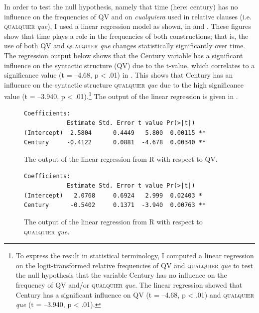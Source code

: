 In order to test the null hypothesis, namely that time (here: century) has no influence on the frequencies of QV and on \textit{cualquiera} used in relative clauses (i.e. \textsc{qualquier} \textit{que}), I used a linear regression model as shown, in  and . These figures show that time plays a role in the frequencies of both constructions; that is, the use of both QV and \textsc{qualquier} \textit{que} changes statistically significantly over time. The regression output below shows that the Century variable has a significant influence on the syntactic structure (QV) due to the t-value, which correlates to a significance value (t = –4.68, p < .01) in . This shows that Century has an influence on the syntactic structure \textsc{qualquier} \textit{que} due to the high significance value (t = –3.940, p < .01).\footnote{{To express the result in statistical terminology, I computed a linear regression on the logit-transformed relative frequencies of QV and} \textsc{qualquier}{ \textit{que}} {to test the null hypothesis that the variable Century has no influence on the frequency of QV and/or} \textsc{qualquier} {\textit{que}}{. The linear regression showed that Century has a significant influence on QV (t = –4.68, p < .01) and} \textsc{qualquier} {\textit{que}} {(t = –3.940, p < .01).}} The output of the linear regression is given in .


\begin{figure}
\begin{lstlisting}
Coefficients:
            Estimate Std. Error t value Pr(>|t|)
(Intercept)  2.5804      0.4449   5.800  0.00115 **
Century     -0.4122      0.0881  -4.678  0.00340 **
\end{lstlisting}

\caption{\label{fig:key:11}The output of the linear regression from R with respect to QV.}
\end{figure}


\begin{figure}
\begin{lstlisting}
Coefficients:
            Estimate Std. Error t value Pr(>|t|)
(Intercept)   2.0768     0.6924   2.999  0.02403 *
Century      -0.5402     0.1371  -3.940  0.00763 **
\end{lstlisting}
\caption{\label{fig:key:12} The output of the linear regression from R with respect to \textsc{qualquier} \textit{que.}}
\end{figure}

